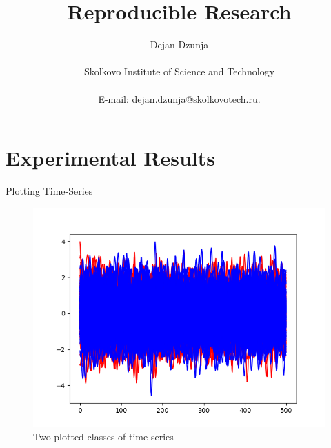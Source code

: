 \documentclass[12pt]{article}
\title{Reproducible Research}
\author
{Dejan Dzunja\\
\\
\normalsize{Skolkovo Institute of Science and Technology}\\
\\
\normalsize{E-mail:  dejan.dzunja@skolkovotech.ru.}
}
\date{}
\begin{document}
 

\maketitle 

\newpage

\section{Experimental Results}

Plotting Time-Series

\begin{figure}[ht]
    \centering
    \includegraphics[width=\textwidth]{figs/plot}
    \caption{Two plotted classes of time series}
\end{figure}
\end{document}
